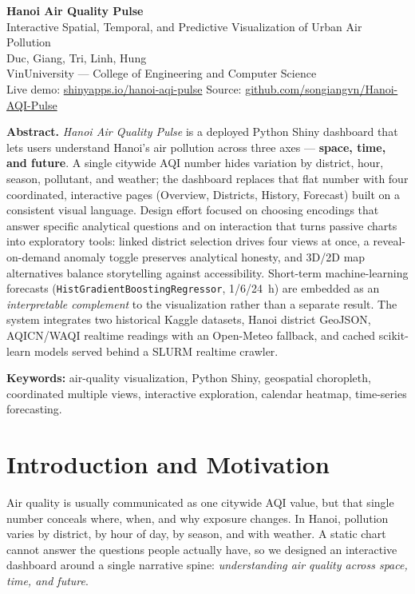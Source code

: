 \documentclass[a4paper]{article}
\begin{document}
\begin{center}
    {\LARGE \textbf{\color{DarkRed} Hanoi Air Quality Pulse}}\\[2pt]
    {\large Interactive Spatial, Temporal, and Predictive Visualization of Urban Air Pollution}\\[8pt]
    {\normalsize Duc, Giang, Tri, Linh, Hung}\\[2pt]
    {\small VinUniversity --- College of Engineering and Computer Science}\\[4pt]
    {\small Live demo: \href{https://giangnguyenson.shinyapps.io/hanoi-aqi-pulse/}{shinyapps.io/hanoi-aqi-pulse}
    \quad\textbar\quad
    Source: \href{https://github.com/songiangvn/Hanoi-AQI-Pulse}{github.com/songiangvn/Hanoi-AQI-Pulse}}
\end{center}

\noindent\textbf{Abstract.}
\textit{Hanoi Air Quality Pulse} is a deployed Python Shiny dashboard that lets users understand Hanoi's
air pollution across three axes --- \textbf{space, time, and future}. A single citywide AQI number hides
variation by district, hour, season, pollutant, and weather; the dashboard replaces that flat number with
four coordinated, interactive pages (Overview, Districts, History, Forecast) built on a consistent
visual language. Design effort focused on choosing encodings that answer specific analytical questions
and on interaction that turns passive charts into exploratory tools: linked district selection drives
four views at once, a reveal-on-demand anomaly toggle preserves analytical honesty, and 3D/2D map
alternatives balance storytelling against accessibility. Short-term machine-learning forecasts
(\texttt{HistGradientBoostingRegressor}, 1/6/24~h) are embedded as an \emph{interpretable complement} to
the visualization rather than a separate result. The system integrates two historical Kaggle datasets,
Hanoi district GeoJSON, AQICN/WAQI realtime readings with an Open-Meteo fallback, and cached scikit-learn
models served behind a SLURM realtime crawler.

\smallskip
\noindent\textbf{Keywords:} air-quality visualization, Python Shiny, geospatial choropleth, coordinated
multiple views, interactive exploration, calendar heatmap, time-series forecasting.

\section{Introduction and Motivation}
Air quality is usually communicated as one citywide AQI value, but that single number conceals where,
when, and why exposure changes. In Hanoi, pollution varies by district, by hour of day, by season, and
with weather. A static chart cannot answer the questions people actually have, so we designed an
interactive dashboard around a single narrative spine: \emph{understanding air quality across space, time,
and future}.
\end{document}
